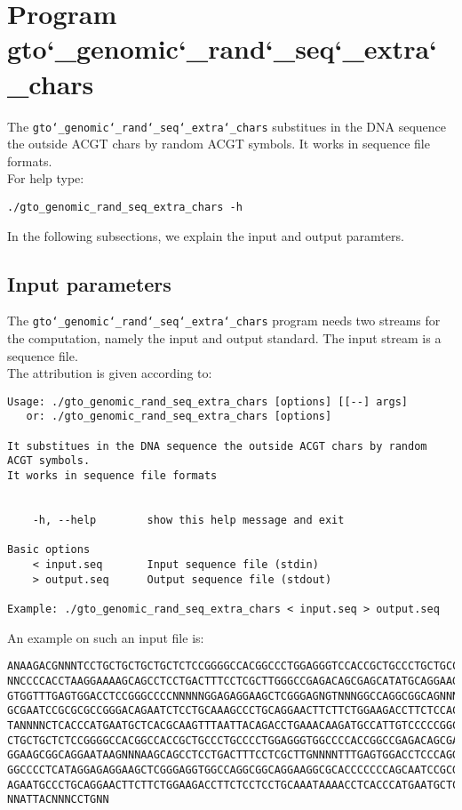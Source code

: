 \section{Program gto\char`_genomic\char`_rand\char`_seq\char`_extra\char`_chars}
The \texttt{gto\char`_genomic\char`_rand\char`_seq\char`_extra\char`_chars} substitues in the DNA sequence the outside ACGT chars by random ACGT symbols. It works in sequence file formats.\\
For help type:
\begin{lstlisting}
./gto_genomic_rand_seq_extra_chars -h
\end{lstlisting}
In the following subsections, we explain the input and output paramters.

\subsection*{Input parameters}

The \texttt{gto\char`_genomic\char`_rand\char`_seq\char`_extra\char`_chars} program needs two streams for the computation, namely the input and output standard. The input stream is a sequence file.\\
The attribution is given according to:
\begin{lstlisting}
Usage: ./gto_genomic_rand_seq_extra_chars [options] [[--] args]
   or: ./gto_genomic_rand_seq_extra_chars [options]

It substitues in the DNA sequence the outside ACGT chars by random ACGT symbols.
It works in sequence file formats


    -h, --help        show this help message and exit

Basic options
    < input.seq       Input sequence file (stdin)
    > output.seq      Output sequence file (stdout)

Example: ./gto_genomic_rand_seq_extra_chars < input.seq > output.seq
\end{lstlisting}
An example on such an input file is:
\begin{lstlisting}
ANAAGACGNNNTCCTGCTGCTGCTGCTCTCCGGGGCCACGGCCCTGGAGGGTCCACCGCTGCCCTGCTGCCATTGTCCCC
NNCCCCACCTAAGGAAAAGCAGCCTCCTGACTTTCCTCGCTTGGGCCGAGACAGCGAGCATATGCAGGAAGCGGCAGGAA
GTGGTTTGAGTGGACCTCCGGGCCCCNNNNNGGAGAGGAAGCTCGGGAGNGTNNNGGCCAGGCGGCAGNNNNCCAGTGCC
GCGAATCCGCGCGCCGGGACAGAATCTCCTGCAAAGCCCTGCAGGAACTTCTTCTGGAAGACCTTCTCCACCCCCCCAGC
TANNNNCTCACCCATGAATGCTCACGCAAGTTTAATTACAGACCTGAAACAAGATGCCATTGTCCCCCGGCCTCCTGCTG
CTGCTGCTCTCCGGGGCCACGGCCACCGCTGCCCTGCCCCTGGAGGGTGGCCCCACCGGCCGAGACAGCGAGCATATGCA
GGAAGCGGCAGGAATAAGNNNAAGCAGCCTCCTGACTTTCCTCGCTTGNNNNTTTGAGTGGACCTCCCAGGCCAGTGCCG
GGCCCCTCATAGGAGAGGAAGCTCGGGAGGTGGCCAGGCGGCAGGAAGGCGCACCCCCCCAGCAATCCGCGCGCCGGGAC
AGAATGCCCTGCAGGAACTTCTTCTGGAAGACCTTCTCCTCCTGCAAATAAAACCTCACCCATGAATGCTCACGCAAGTT
NNATTACNNNCCTGNN
\end{lstlisting}

